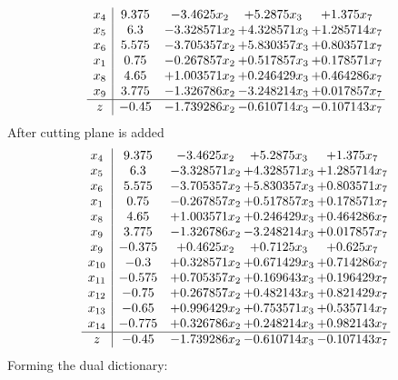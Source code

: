 \documentclass[11pt]{article}
\begin{document}
\[\begin{array}{c| c c@{\hskip 2pt} c@{\hskip 2pt} c@{\hskip 2pt} }
 x_{4}   &  9.375 & -3.4625 x_{2} & + 5.2875 x_{3} & + 1.375 x_{7}\\
 x_{5}   &  6.3 & -3.328571 x_{2} & + 4.328571 x_{3} & + 1.285714 x_{7}\\
 x_{6}   &  5.575 & -3.705357 x_{2} & + 5.830357 x_{3} & + 0.803571 x_{7}\\
 x_{1}   &  0.75 & -0.267857 x_{2} & + 0.517857 x_{3} & + 0.178571 x_{7}\\
 x_{8}   &  4.65 & + 1.003571 x_{2} & + 0.246429 x_{3} & + 0.464286 x_{7}\\
 x_{9}   &  3.775 & -1.326786 x_{2} & -3.248214 x_{3} & + 0.017857 x_{7}\\
\hline
z    &  -0.45 & -1.739286 x_{2} & -0.610714 x_{3} & -0.107143 x_{7}\\
\end{array}\]
 After cutting plane is added 
\[\begin{array}{c| c c@{\hskip 2pt} c@{\hskip 2pt} c@{\hskip 2pt} }
 x_{4}   &  9.375 & -3.4625 x_{2} & + 5.2875 x_{3} & + 1.375 x_{7}\\
 x_{5}   &  6.3 & -3.328571 x_{2} & + 4.328571 x_{3} & + 1.285714 x_{7}\\
 x_{6}   &  5.575 & -3.705357 x_{2} & + 5.830357 x_{3} & + 0.803571 x_{7}\\
 x_{1}   &  0.75 & -0.267857 x_{2} & + 0.517857 x_{3} & + 0.178571 x_{7}\\
 x_{8}   &  4.65 & + 1.003571 x_{2} & + 0.246429 x_{3} & + 0.464286 x_{7}\\
 x_{9}   &  3.775 & -1.326786 x_{2} & -3.248214 x_{3} & + 0.017857 x_{7}\\
 x_{9}   &  -0.375 & + 0.4625 x_{2} & + 0.7125 x_{3} & + 0.625 x_{7}\\
 x_{10}   &  -0.3 & + 0.328571 x_{2} & + 0.671429 x_{3} & + 0.714286 x_{7}\\
 x_{11}   &  -0.575 & + 0.705357 x_{2} & + 0.169643 x_{3} & + 0.196429 x_{7}\\
 x_{12}   &  -0.75 & + 0.267857 x_{2} & + 0.482143 x_{3} & + 0.821429 x_{7}\\
 x_{13}   &  -0.65 & + 0.996429 x_{2} & + 0.753571 x_{3} & + 0.535714 x_{7}\\
 x_{14}   &  -0.775 & + 0.326786 x_{2} & + 0.248214 x_{3} & + 0.982143 x_{7}\\
\hline
z    &  -0.45 & -1.739286 x_{2} & -0.610714 x_{3} & -0.107143 x_{7}\\
\end{array}\]
Forming the dual dictionary:
\end{document}
